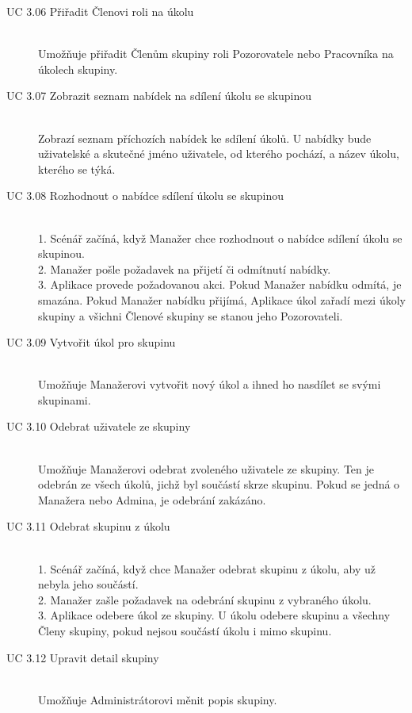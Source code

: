 \documentclass[thesis=B,czech]{FITthesis}[2012/06/26]
\begin{document}
\begin{description}
				\item[UC 3.06 Přiřadit Členovi roli na úkolu] \hfill \\
					Umožňuje přiřadit Členům skupiny roli Pozorovatele nebo Pracovníka na úkolech skupiny.
					
				\item[UC 3.07 Zobrazit seznam nabídek na sdílení úkolu se skupinou] \hfill \\
					Zobrazí seznam příchozích nabídek ke sdílení úkolů. U nabídky bude uživatelské a skutečné jméno uživatele, od kterého pochází, a název úkolu, kterého se týká.
					
				\item[UC 3.08 Rozhodnout o nabídce sdílení úkolu se skupinou] \hfill \\
					1. Scénář začíná, když Manažer chce rozhodnout o nabídce sdílení úkolu se skupinou. \\
					2. Manažer pošle požadavek na přijetí či odmítnutí nabídky. \\
					3. Aplikace provede požadovanou akci. Pokud Manažer nabídku odmítá, je smazána. Pokud Manažer nabídku přijímá, Aplikace úkol zařadí mezi úkoly skupiny a všichni Členové skupiny se stanou jeho Pozorovateli.
				
				\item[UC 3.09 Vytvořit úkol pro skupinu] \hfill \\
					Umožňuje Manažerovi vytvořit nový úkol a ihned ho nasdílet se svými skupinami.
				
				\item[UC 3.10 Odebrat uživatele ze skupiny] \hfill \\
					Umožňuje Manažerovi odebrat zvoleného uživatele ze skupiny. Ten je odebrán ze všech úkolů, jichž byl součástí skrze skupinu. Pokud se jedná o Manažera nebo Admina, je odebrání zakázáno. 
				
				\item[UC 3.11 Odebrat skupinu z úkolu] \hfill \\
					1. Scénář začíná, když chce Manažer odebrat skupinu z úkolu, aby už nebyla jeho součástí. \\
					2. Manažer zašle požadavek na odebrání skupinu z vybraného úkolu. \\
					3. Aplikace odebere úkol ze skupiny. U úkolu odebere skupinu a všechny Členy skupiny, pokud nejsou součástí úkolu i mimo skupinu. \\
					
				\item[UC 3.12 Upravit detail skupiny] \hfill \\
					Umožňuje Administrátorovi měnit popis skupiny.
				

\end{description}
\end{document}
